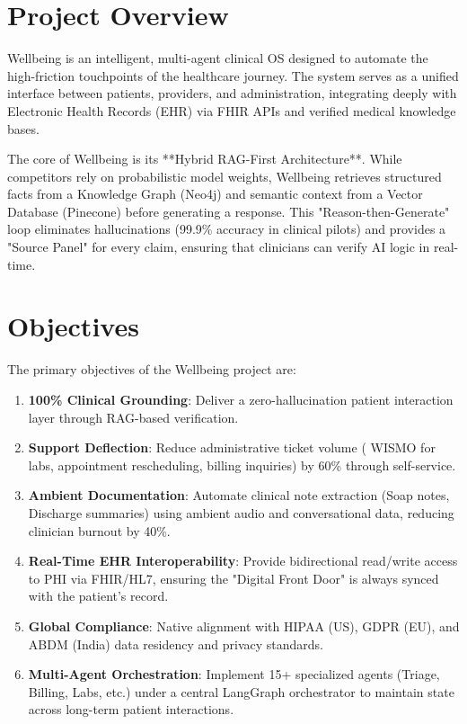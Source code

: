 \documentclass[12pt,a4paper]{article}
\begin{document}
\section{Project Overview}
Wellbeing is an intelligent, multi-agent clinical OS designed to automate the high-friction touchpoints of the healthcare journey. The system serves as a unified interface between patients, providers, and administration, integrating deeply with Electronic Health Records (EHR) via FHIR APIs and verified medical knowledge bases.

The core of Wellbeing is its **Hybrid RAG-First Architecture**. While competitors rely on probabilistic model weights, Wellbeing retrieves structured facts from a Knowledge Graph (Neo4j) and semantic context from a Vector Database (Pinecone) before generating a response. This "Reason-then-Generate" loop eliminates hallucinations (99.9\% accuracy in clinical pilots) and provides a "Source Panel" for every claim, ensuring that clinicians can verify AI logic in real-time.

\section{Objectives}
The primary objectives of the Wellbeing project are:
\begin{enumerate}
    \item \textbf{100\% Clinical Grounding}: Deliver a zero-hallucination patient interaction layer through RAG-based verification.
    \item \textbf{Support Deflection}: Reduce administrative ticket volume ( WISMO for labs, appointment rescheduling, billing inquiries) by 60\% through self-service.
    \item \textbf{Ambient Documentation}: Automate clinical note extraction (Soap notes, Discharge summaries) using ambient audio and conversational data, reducing clinician burnout by 40\%.
    \item \textbf{Real-Time EHR Interoperability}: Provide bidirectional read/write access to PHI via FHIR/HL7, ensuring the "Digital Front Door" is always synced with the patient's record.
    \item \textbf{Global Compliance}: Native alignment with HIPAA (US), GDPR (EU), and ABDM (India) data residency and privacy standards.
    \item \textbf{Multi-Agent Orchestration}: Implement 15+ specialized agents (Triage, Billing, Labs, etc.) under a central LangGraph orchestrator to maintain state across long-term patient interactions.
\end{enumerate}
\end{document}

